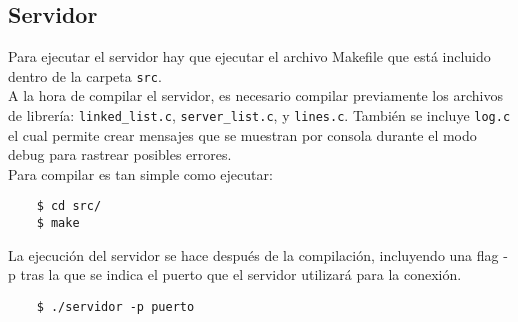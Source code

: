 \subsection{Servidor}

Para ejecutar el servidor hay que ejecutar el archivo Makefile que está incluido dentro de la carpeta \texttt{src}.\\

A la hora de compilar el servidor, es necesario compilar previamente los archivos de
librería: \texttt{linked\_list.c}, \texttt{server\_list.c}, y \texttt{lines.c}. También se incluye \texttt{log.c} el cual permite crear mensajes que se muestran por consola durante el modo debug para rastrear posibles errores.\\

Para compilar es tan simple como ejecutar:
\begin{lstlisting}
    $ cd src/
    $ make
\end{lstlisting}

La ejecución del servidor se hace después de la compilación, incluyendo una flag -p tras la que se indica el puerto que el servidor utilizará para la conexión.
\begin{lstlisting}
    $ ./servidor -p puerto
\end{lstlisting}